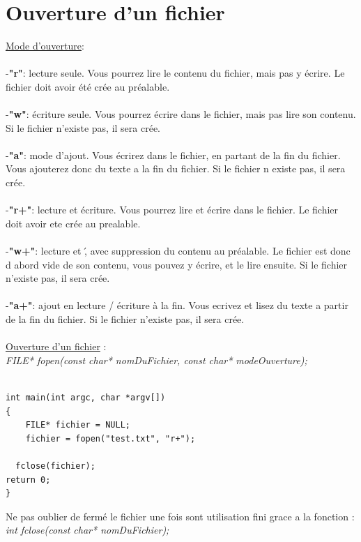 \documentclass[a4paper,12pt,openany]{book}
\begin{document}
\section{Ouverture d'un fichier}

\underline{Mode d'ouverture}:\\
\\
-\textbf{"r"}: lecture seule. Vous pourrez lire le contenu du fichier, mais pas y \'ecrire. Le fichier doit avoir \'et\'e cr\'ee au pr\'ealable.\\
\\
-\textbf{"w"}: \'ecriture seule. Vous pourrez \'ecrire dans le fichier, mais pas lire son contenu. Si le fichier n'existe pas, il sera cr\'ee.\\
\\
-\textbf{"a"}: mode d'ajout. Vous \'ecrirez dans le fichier, en partant de la fin du fichier. Vous ajouterez donc du texte a la fin du fichier. Si le fichier n existe pas, il sera cr\'ee.\\
\\
-\textbf{"r+"}: lecture et \'ecriture. Vous pourrez lire et \'ecrire dans le fichier. Le fichier doit avoir ete cr\'ee au prealable.\\
\\
-\textbf{"w+"}: lecture et \', avec suppression du contenu au pr\'ealable. Le fichier est donc d abord vide de son contenu, vous pouvez y \'ecrire, et le lire ensuite. Si le fichier n'existe pas, il sera cr\'ee.\\
\\
-\textbf{"a+"}: ajout en lecture / \'ecriture \`a la fin. Vous ecrivez et lisez du texte a partir de la fin du fichier. Si le fichier n'existe pas, il sera cr\'ee.\\
\\
\underline{Ouverture d'un fichier} :\\
\emph{FILE* fopen(const char* nomDuFichier, const char* modeOuverture);}\\
\\
\begin{verbatim}
int main(int argc, char *argv[])
{
	FILE* fichier = NULL;
	fichier = fopen("test.txt", "r+");

  fclose(fichier);
return 0;
}
\end{verbatim}

Ne pas oublier de fermé le fichier une fois sont utilisation fini grace a la fonction :\\
 \emph{int fclose(const char* nomDuFichier);}\\
\end{document}
